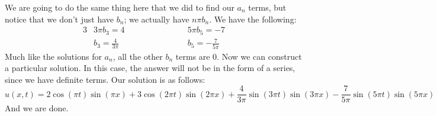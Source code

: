 \documentclass{article}
\begin{document}
\noindent We are going to do the same thing here that we did to find our $a_{n}$
terms, but notice that we don't just have $b_{n}$; we actually have $n\pi b_{n}$.
We have the following:
\begin{alignat*}{3}
&3\pi b_{3} = 4 \qquad \qquad \qquad &&5\pi b_{5} = -7\\
&b_{3} = \frac{4}{3\pi} &&b_{5} = -\frac{7}{5\pi}
\end{alignat*}
\noindent Much like the solutions for $a_{n}$, all the other $b_{n}$ terms are 0.
Now we can construct a particular solution. In this case, the answer will not be
in the form of a series, since we have definite terms. Our solution is as follows:
\[
u(x,t) = 2\cos{(\pi t)}\sin{(\pi x)} + 3\cos{(2\pi t)}\sin{(2\pi x)} + \frac{4}{3\pi}\sin{(3\pi
t)}\sin{(3\pi x)} - \frac{7}{5\pi}\sin{(5\pi t)}\sin{(5\pi x)}
\]
\noindent And we are done.
\newpage
\end{document}
